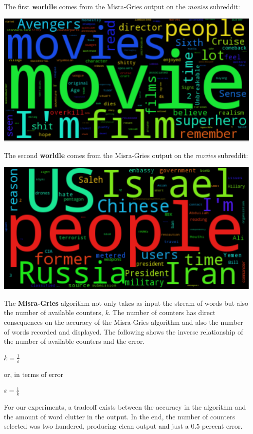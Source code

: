 \documentclass[12pt]{article}
\numberwithin{equation}{section}
\begin{document}
The first \textbf{worldle} comes from the Misra-Gries output on the \textit{movies} subreddit:

\includegraphics[scale=.5]{movies.png}

The second \textbf{worldle} comes from the Misra-Gries output on the \textit{movies} subreddit:

\includegraphics[scale=.5]{worldnews.png}

The \textbf{Misra-Gries} algorithm not only takes as input the stream of words but also the number of available counters, \textit{k}.  The number of counters has direct consequences on the accuracy of the Misra-Gries algorithm and also the number of words recorded and displayed.  The following shows the inverse relationship of the number of available counters and the error.    

$k=\frac { 1 }{ \varepsilon  } $  

or, in terms of error 

$\varepsilon =\frac { 1 }{ k  } $ 

For our experiments, a tradeoff exists between the accuracy in the algorithm and the amount of word clutter in the output.  In the end, the number of counters selected was two hundered, producing clean output and just a 0.5 percent error.
\end{document}
